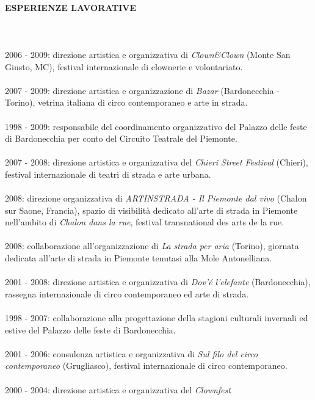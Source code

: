 \documentclass[a4paper, 12pt]{article}
\begin{document}
\paragraph{ESPERIENZE LAVORATIVE}
\ \\
\ \\
2006 - 2009: direzione artistica e organizzativa di \emph{Clown\&Clown}
(Monte San Giusto, MC), festival internazionale di clownerie e volontariato.
\\
\ \\
2007 - 2009: direzione artistica e organizzazione di \emph{Bazar}
(Bardonecchia - Torino), vetrina italiana di circo contemporaneo e arte in
strada.
\\
\ \\
1998 - 2009: responsabile del coordinamento organizzativo del Palazzo delle
feste di Bardonecchia per conto del Circuito Teatrale del Piemonte.
\\
\ \\
2007 - 2008: direzione artistica e organizzativa del \emph{Chieri Street
Festival} (Chieri), festival internazionale di teatri di strada e arte
urbana.
\\
\ \\
2008: direzione organizzativa di \emph{ARTINSTRADA - Il Piemonte dal vivo}
(Chalon sur Saone, Francia), spazio di visibilit\`a dedicato all'arte di
strada in Piemonte nell'ambito di \emph{Chalon dans la rue}, festival 
transnational des arts de la rue.
\\
\ \\
2008: collaborazione all'organizzazione di \emph{La strada per aria}
(Torino), giornata dedicata all'arte di strada in Piemonte tenutasi alla
Mole Antonelliana.
\\
\ \\
2001 - 2008: direzione artistica e organizzativa di
\emph{Dov'\'e l'elefante} (Bardonecchia), rassegna internazionale di circo 
contemporaneo ed arte di strada.
\\
\ \\
1998 - 2007: collaborazione alla progettazione della stagioni culturali
invernali ed estive del Palazzo delle feste di Bardonecchia.
\\
\ \\
2001 - 2006: consulenza artistica e organizzativa di \emph{Sul filo del
circo contemporaneo} (Grugliasco), festival internazionale di circo
contemporaneo.
\\
\ \\
2000 - 2004: direzione artistica e organizzativa del \emph{Clownfest}
\end{document}
